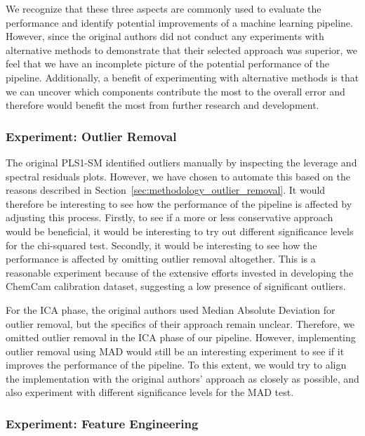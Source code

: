 \noindent
We recognize that these three aspects are commonly used to evaluate the performance and identify potential improvements of a machine learning pipeline.
However, since the original authors did not conduct any experiments with alternative methods to demonstrate that their selected approach was superior, we feel that we have an incomplete picture of the potential performance of the pipeline.
Additionally, a benefit of experimenting with alternative methods is that we can uncover which components contribute the most to the overall error and therefore would benefit the most from further research and development.

\subsubsection{Experiment: Outlier Removal}\label{sec:experiment_outlier_removal}
The original PLS1-SM identified outliers manually by inspecting the leverage and spectral residuals plots.
However, we have chosen to automate this based on the reasons described in Section~\ref{sec:methodology_outlier_removal}.
It would therefore be interesting to see how the performance of the pipeline is affected by adjusting this process.
Firstly, to see if a more or less conservative approach would be beneficial, it would be interesting to try out different significance levels for the chi-squared test.
Secondly, it would be interesting to see how the performance is affected by omitting outlier removal altogether.
This is a reasonable experiment because of the extensive efforts invested in developing the ChemCam calibration dataset, suggesting a low presence of significant outliers.

For the ICA phase, the original authors used Median Absolute Deviation for outlier removal, but the specifics of their approach remain unclear.
Therefore, we omitted outlier removal in the ICA phase of our pipeline.
However, implementing outlier removal using MAD would still be an interesting experiment to see if it improves the performance of the pipeline.
To this extent, we would try to align the implementation with the original authors' approach as closely as possible, and also experiment with different significance levels for the MAD test.

\subsubsection{Experiment: Feature Engineering}\label{sec:experiment_feature_engineering}


